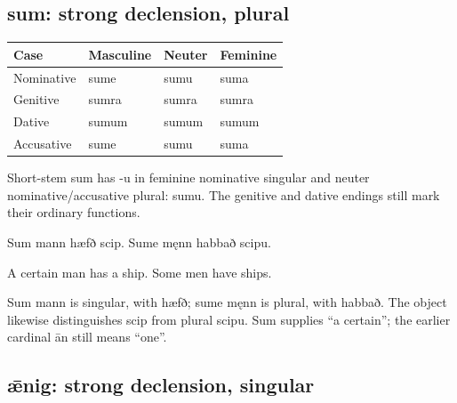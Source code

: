 \subsection*{sum: strong declension, plural}

\par\begingroup
\fontsize{10.5}{13.2}\selectfont
\setlength{\LTleft}{0pt}\setlength{\LTright}{\fill}
\noindent
\begin{tabular}{@{}>{\raggedright\arraybackslash}p{28.89mm}>{\raggedright\arraybackslash}p{28.89mm}>{\raggedright\arraybackslash}p{28.89mm}>{\raggedright\arraybackslash}p{28.89mm}@{}}
\toprule
\textbf{Case} & \textbf{Masculine} & \textbf{Neuter} & \textbf{Feminine} \\
\midrule
Nominative & sume & sumu & suma \\
Genitive & sumra & sumra & sumra \\
Dative & sumum & sumum & sumum \\
Accusative & sume & sumu & suma \\
\bottomrule
\end{tabular}
\par\endgroup

Short-stem sum has -u in feminine nominative singular and neuter nominative/\allowbreak{}accusative plural: sumu. The genitive and dative endings still mark their ordinary functions.

Sum mann hæfð scip. Sume męnn habbað scipu.

A certain man has a ship. Some men have ships.

Sum mann is singular, with hæfð; sume męnn is plural, with habbað. The object likewise distinguishes scip from plural scipu. Sum supplies “a certain”; the earlier cardinal ān still means “one”.

\subsection*{ǣnig: strong declension, singular}

